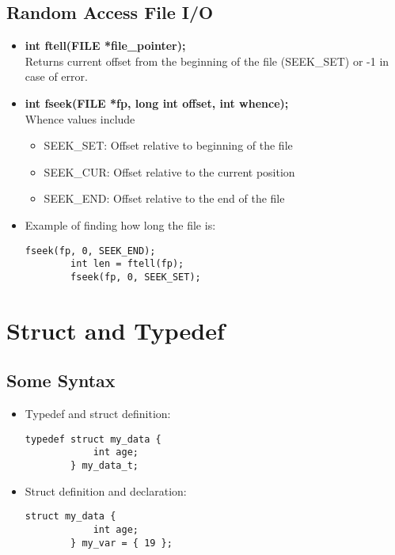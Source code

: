 \documentclass{article}
\begin{document}
\subsection{Random Access File I/O}
\begin{itemize}
    \item \textbf{int ftell(FILE *file\_pointer);}\\
    Returns current offset from the beginning of the file (SEEK\_SET) or -1 in case of error.
    \item \textbf{int fseek(FILE *fp, long int offset, int whence);}\\
    Whence values include
    \begin{itemize}
        \item SEEK\_SET: Offset relative to beginning of the file 
        \item SEEK\_CUR: Offset relative to the current position
        \item SEEK\_END: Offset relative to the end of the file
    \end{itemize}
    \item Example of finding how long the file is:
    \begin{lstlisting}[style=CStyle]
        fseek(fp, 0, SEEK_END);
        int len = ftell(fp);
        fseek(fp, 0, SEEK_SET);
    \end{lstlisting}
\end{itemize}

\section{Struct and Typedef}

\subsection{Some Syntax}
\begin{itemize}
    \item Typedef and struct definition:
    \begin{lstlisting}[style=CStyle]
        typedef struct my_data {
            int age;
        } my_data_t;
    \end{lstlisting}
    \item Struct definition and declaration:
    \begin{lstlisting}[style=CStyle]
        struct my_data {
            int age;
        } my_var = { 19 };
    \end{lstlisting}
\end{itemize}
\end{document}
